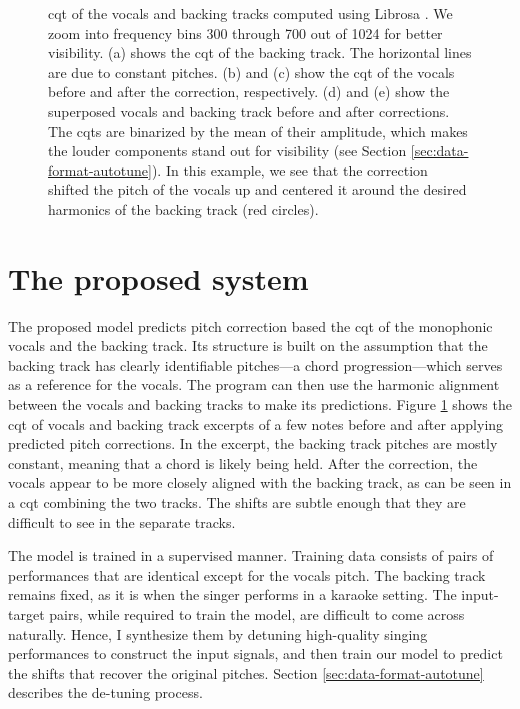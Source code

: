 \begin{figure}[t]
    \caption{
    \gls{cqt} of the vocals and backing tracks computed using Librosa \cite{mcfee2015librosa}. We zoom into frequency bins 300 through 700 out of 1024 for better visibility. (a) shows the \gls{cqt} of the backing track. The horizontal lines are due to constant pitches. (b) and (c) show the \gls{cqt} of the vocals before and after the correction, respectively. (d) and (e) show the superposed vocals and backing track before and after corrections. The \gls{cqt}s are binarized by the mean of their amplitude, which makes the louder components stand out for visibility (see Section \ref{sec:data-format-autotune}). In this example, we see that the correction shifted the pitch of the vocals up and centered it around the desired harmonics of the backing track (red circles).
    }
    \label{fig:model-input-autotune}
\end{figure}

\section{The proposed system}
\label{sec:proposed-autotune}
The proposed model predicts pitch correction based the \gls{cqt} of the monophonic vocals and the backing track. Its structure is built on the assumption that the backing track has clearly identifiable pitches---a chord progression---which serves as a reference for the vocals. The program can then use the harmonic alignment between the vocals and backing tracks to make its predictions. Figure \ref{fig:model-input-autotune} shows the \gls{cqt} of vocals and backing track excerpts of a few notes before and after applying predicted pitch corrections. In the excerpt, the backing track pitches are mostly constant, meaning that a chord is likely being held. After the correction, the vocals appear to be more closely aligned with the backing track, as can be seen in a \gls{cqt} combining the two tracks. The shifts are subtle enough that they are difficult to see in the separate tracks. 

The model is trained in a supervised manner. Training data consists of pairs of performances that are identical except for the vocals pitch. The backing track remains fixed, as it is when the singer performs in a karaoke setting. The input-target pairs, while required to train the model, are difficult to come across naturally. Hence, I synthesize them by detuning high-quality singing performances to construct the input signals, and then train our model to predict the shifts that recover the original pitches. Section \ref{sec:data-format-autotune} describes the de-tuning process.

